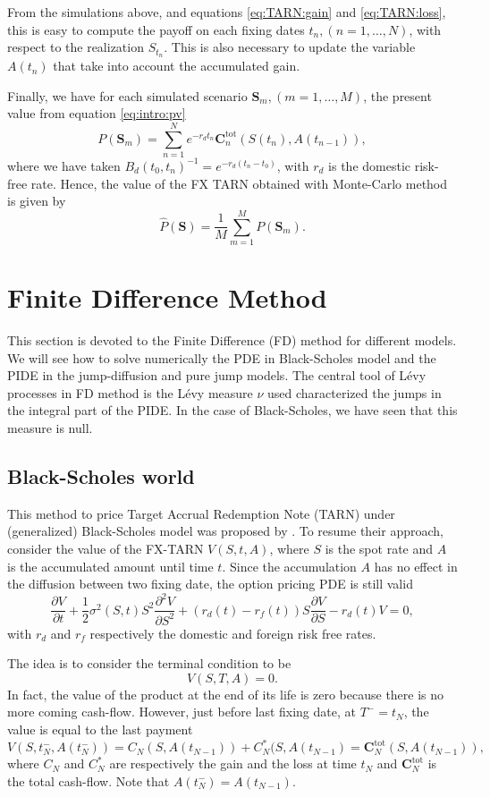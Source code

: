 From the simulations above, and equations \eqref{eq:TARN:gain} and \eqref{eq:TARN:loss}, this is easy to compute the payoff on each fixing dates $t_n, (n=1,\ldots,N)$, with respect to the realization $S_{t_n}$. This is also necessary to update the variable $A(t_n)$ that take into account the accumulated gain. 

Finally, we have for each simulated scenario $\mathbf{S}_m, (m=1,\ldots,M)$, the present value from equation \eqref{eq:intro:pv}
$$P(\mathbf{S}_m) = \sum_{n=1}^{N}e^{-r_d t_n}\mathbf{C}^\text{tot}_n(S(t_n),A(t_{n-1})),$$
where we have taken $B_d(t_0,t_n)^{-1}=e^{-r_d (t_n-t_0)}$, with $r_d$ is the domestic risk-free rate. Hence, the value of the FX TARN obtained with Monte-Carlo method is given by
$$\hat{P}(\mathbf{S})=\frac{1}{M}\sum_{m=1}^M P(\mathbf{S}_m).$$

\section{Finite Difference Method}
\label{sec:methods:FD}
This section is devoted to the Finite Difference (FD) method for different models. We will see how to solve numerically the PDE in Black-Scholes model and the PIDE in the jump-diffusion and pure jump models. The central tool of L\'evy processes in FD method is the L\'evy measure $\nu$ used characterized the jumps in the integral part of the PIDE. In the case of Black-Scholes, we have seen that this measure is null.

\subsection{Black-Scholes world}
This method to price Target Accrual Redemption Note (TARN) under (generalized) Black-Scholes model was proposed by \citeauthor{LS15} \citeyearpar{LS15}. To resume their approach, consider the value of the FX-TARN $V(S,t,A)$, where $S$ is the spot rate and $A$ is the accumulated amount until time $t$. Since the accumulation $A$ has no effect in the diffusion between two fixing date, the option pricing PDE is still valid
\begin{equation}\label{eq:PDE}
\frac{\partial V}{\partial t}+\frac{1}{2}\sigma^2(S,t)S^2\frac{\partial^2 V}{\partial S^2}+\left(r_d(t) -r_f(t)\right)S\frac{\partial V}{\partial S}-r_d(t) V = 0,
\end{equation}
with $r_d$ and $r_f$ respectively the domestic and foreign risk free rates.

The idea is to consider the terminal condition to be 
$$V(S,T,A) = 0.$$
In fact, the value of the product at the end of its life is zero because there is no more coming cash-flow. However, just before last fixing date, at $T^-=t_N$, the value is equal to the last payment 
$$V(S,t_N^-,A(t_N^-)) = C_N(S,A(t_{N-1})) + C^\ast_N(S,A(t_{N-1})=\mathbf{C}^\text{tot}_N(S,A(t_{N-1})),$$
where $C_N$ and $C^\ast_N$ are respectively the gain and the loss at time $t_N$ and $\mathbf{C}^\text{tot}_N$ is the total cash-flow. Note that $A(t_N^-)=A(t_{N-1})$. 

